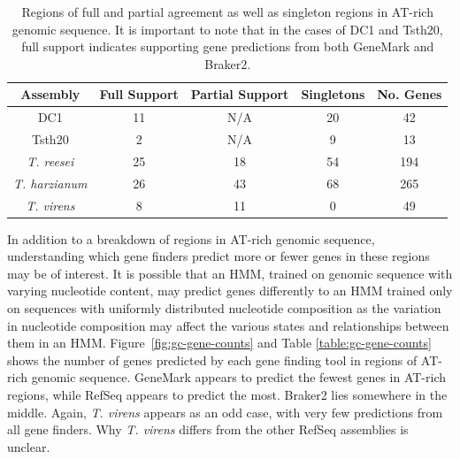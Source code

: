 \begin{table}
  \begin{center}
    \begin{tabular}{|c|c|c|c|c|}
      \hline
      Assembly & Full Support & Partial Support & Singletons & No. Genes \\ \hline
      DC1 & 11 & N/A & 20 & 42  \\ \hline
      Tsth20 & 2 & N/A & 9 & 13  \\ \hline
      \textit{T. reesei} & 25 & 18 & 54 & 194  \\ \hline
      \textit{T. harzianum} & 26 & 43 & 68 & 265  \\ \hline
      \textit{T. virens} & 8 & 11 & 0 & 49  \\ \hline
    \end{tabular}
  \end{center}
  \caption[Agreement of gene predictions in AT-rich regions]{Regions of full and partial agreement as well as singleton regions in AT-rich genomic sequence. It is important to note that in the cases of DC1 and Tsth20, full support indicates supporting gene predictions from both GeneMark and Braker2.}
  \label{table:gc-regions}
\end{table}

In addition to a breakdown of regions in AT-rich genomic sequence,
understanding which gene finders predict more or fewer genes in these
regions may be of interest. It is possible that an HMM, trained on
genomic sequence with varying nucleotide content, may predict genes
differently to an HMM trained only on sequences with uniformly
distributed nucleotide composition as the variation in nucleotide
composition may affect the various states and relationships between
them in an HMM. Figure~\ref{fig:gc-gene-counts} and Table \ref{table:gc-gene-counts} shows the number of
genes predicted by each gene finding tool in regions of AT-rich
genomic sequence. GeneMark appears to predict the fewest genes in
AT-rich regions, while RefSeq appears to predict the most. Braker2
lies somewhere in the middle. Again, \textit{T. virens} appears as an
odd case, with very few predictions from all gene finders. Why
\textit{T. virens} differs from the other RefSeq assemblies is
unclear.

